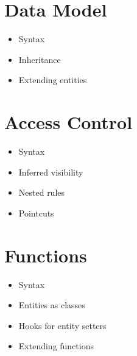   \section{Data Model}

    \begin{itemize}
      \item Syntax
      \item Inheritance
      \item Extending entities
    \end{itemize}

  \section{Access Control}

    \begin{itemize}
      \item Syntax
      \item Inferred visibility
      \item Nested rules
      \item Pointcuts
    \end{itemize}

  \section{Functions}

  \begin{itemize}
    \item Syntax
    \item Entities as classes
    \item Hooks for entity setters
    \item Extending functions
  \end{itemize}
